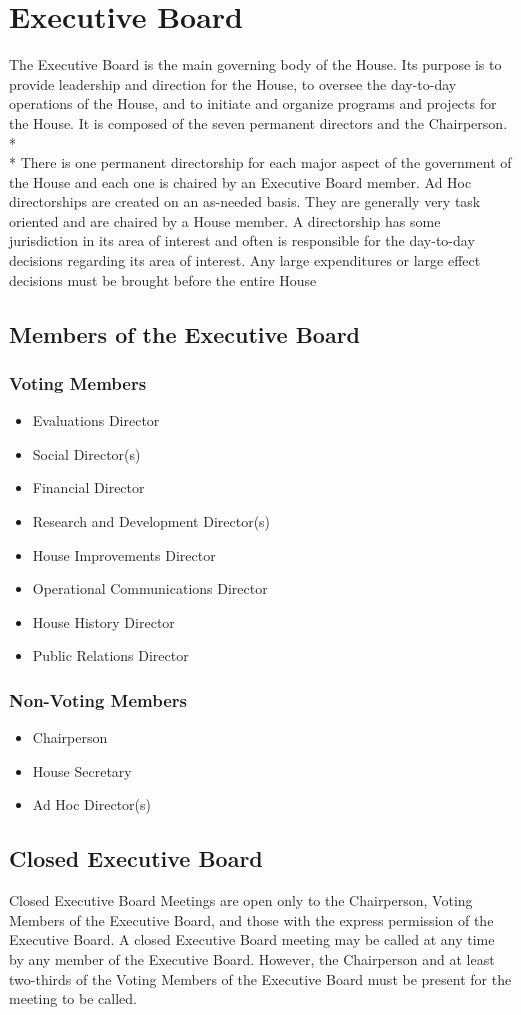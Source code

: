 \documentclass{article}
\newcommand{\article}[1]{\section{#1} \label{#1}}
\newcommand{\asection}[1]{\subsection{#1} \label{#1}}
\newcommand{\asubsection}[1]{\subsubsection{#1} \label{#1}}
\begin{document}
\article{Executive Board}
The Executive Board is the main governing body of the House.
Its purpose is to provide leadership and direction for the House, to oversee the day-to-day operations of the House, and to initiate and organize programs and projects for the House.
It is composed of the seven permanent directors and the Chairperson.
\\*\\*
There is one permanent directorship for each major aspect of the government of the House and each one is chaired by an Executive Board member.
Ad Hoc directorships are created on an as-needed basis.
They are generally very task oriented and are chaired by a House member.
A directorship has some jurisdiction in its area of interest and often is responsible for the day-to-day decisions regarding its area of interest.
Any large expenditures or large effect decisions must be brought before the entire House
\asection{Members of the Executive Board}
\asubsection{Voting Members}
\begin{itemize}
	\item Evaluations Director
	\item Social Director(s)
	\item Financial Director
	\item Research and Development Director(s)
	\item House Improvements Director
	\item Operational Communications Director
	\item House History Director
	\item Public Relations Director
\end{itemize}
\asubsection{Non-Voting Members}
\begin{itemize}
	\item Chairperson
	\item House Secretary
	\item Ad Hoc Director(s)
\end{itemize}
\asection{Closed Executive Board}
Closed Executive Board Meetings are open only to the Chairperson, Voting Members of the Executive Board, and those with the express permission of the Executive Board.
A closed Executive Board meeting may be called at any time by any member of the Executive Board.
However, the Chairperson and at least two-thirds of the Voting Members of the Executive Board must be present for the meeting to be called.
\end{document}
